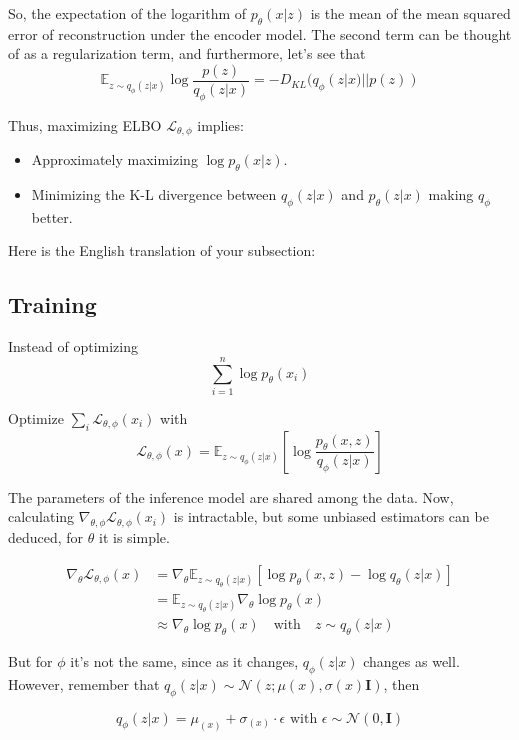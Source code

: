 \documentclass[twocolumn, 9pt]{article}
\begin{document}
So, the expectation of the logarithm of \(p_\theta(x|z)\) is the mean of the mean squared error of reconstruction under the encoder model. The second term can be thought of as a regularization term, and furthermore, let's see that
\[
\mathbb{E}_{z \sim q_\phi(z|x)} \log \frac{p(z)}{q_\phi(z|x)} = -D_{KL}(q_\phi(z|x) || p(z))
\]

Thus, maximizing ELBO \(\mathcal{L}_{\theta,\phi}\) implies:
\begin{itemize}
    \item Approximately maximizing \(\log p_\theta(x|z)\).
    \item Minimizing the K-L divergence between \(q_\phi(z|x)\) and \(p_\theta(z|x)\) making \(q_\phi\) better.
\end{itemize}

Here is the English translation of your subsection:

\subsection{Training}

Instead of optimizing
\[
\sum_{i=1}^n \log p_\theta(x_i)
\]

Optimize \( \sum_i \mathcal{L}_{\theta,\phi}(x_i)\) with
\[
\mathcal{L}_{\theta,\phi}(x) = \mathbb{E}_{z \sim q_\phi(z|x)} \left[ \log \frac{p_\theta(x,z)}{q_\phi(z|x)} \right]
\]

The parameters of the inference model are shared among the data. Now, calculating $\nabla_{\theta, \phi} \mathcal{L}_{\theta, \phi}(x_i)$ is intractable, but some unbiased estimators can be deduced, for $\theta$ it is simple.

\begin{align*}
\nabla_{\theta} \mathcal{L}_{\theta, \phi}(x) &= \nabla_{\theta} \mathbb{E}_{z \sim q_{\theta}(z|x)} \left[\log p_{\theta}(x, z) - \log q_{\theta}(z|x) \right] \\
&= \mathbb{E}_{z \sim q_{\theta}(z|x)} \nabla_{\theta} \log p_{\theta}(x)   \\
&\approx \nabla_{\theta} \log p_{\theta}(x) \quad \text{with} \quad z \sim q_{\theta}(z|x)
\end{align*}

But for $\phi$ it's not the same, since as it changes, $q_{\phi}(z|x)$ changes as well. However, remember that $q_{\phi}(z|x) \sim \mathcal{N}(z; \mu(x), \sigma(x)\mathbf{I})$, then 

$$
q_{\phi}(z|x) = \mu_(x) + \sigma_(x) \cdot \epsilon \text{ with } \epsilon \sim \mathcal{N}(0, \mathbf{I})
$$
\end{document}

